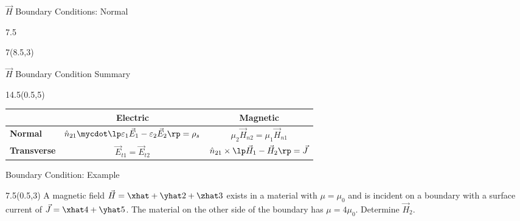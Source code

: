\begin{lesson29}
\begin{frame}{$\vec{H}$ Boundary Conditions: Normal}
\begin{textblock}{7.5}
{

} %
\end{textblock}
\begin{textblock}{7}(8.5,3)
\begin{scriptsize}
\end{scriptsize}
\end{textblock}
\end{frame}

\begin{frame}{$\vec{H}$ Boundary Condition Summary}
\begin{textblock}{14.5}(0.5,5)
\begin{center}
\renewcommand{\arraystretch}{1.5}
\begin{tabular}{| l | c | c | }
\hline

	& \textbf{Electric} 	
	& \textbf{Magnetic} \\\hline\hline
\textbf{Normal}		
	& $\hat{n}_{21} \mycdot \lp \varepsilon_1 \vec{E}_1 - \varepsilon_2 \vec{E}_2 \rp = \rho_s$
	& $\mu_2 \vec{H}_{n2}  = \mu_1  \vec{H}_{n1}$ \\ \hline
\textbf{Transverse}	
	& $\vec{E}_{t1} = \vec{E}_{t2}$ 
	&$ \hat{n}_{21} \times \lp \vec{H}_1 - \vec{H}_2 \rp = \vec{J} $\\ \hline					
\end{tabular}
\end{center}
\end{textblock}
\end{frame}

\begin{frame}{Boundary Condition: Example}
\begin{textblock}{7.5}(0.5,3)
A magnetic field $\vec{H} = \xhat + \yhat 2 + \zhat 3$ exists in a material with $\mu = \mu_0$ and is incident on a boundary with a surface current of $\vec{J} = \xhat 4 + \yhat 5$. The material on the other side of the boundary has $\mu = 4\mu_0$. Determine $\vec{H}_2$. 


\end{textblock}
\end{frame}
\end{lesson29}
